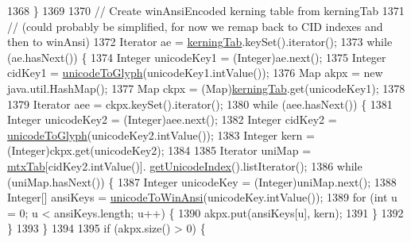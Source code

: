 \begin{DoxyCode}
1368             \}
1369 
1370             \textcolor{comment}{// Create winAnsiEncoded kerning table from kerningTab}
1371             \textcolor{comment}{// (could probably be simplified, for now we remap back to CID indexes and then to winAnsi)}
1372             Iterator ae = \mbox{\hyperlink{classorg_1_1newdawn_1_1slick_1_1tools_1_1hiero_1_1truetype_1_1_t_t_f_file_aff91f31cbfd733d87daa89435a5245fd}{kerningTab}}.keySet().iterator();
1373             \textcolor{keywordflow}{while} (ae.hasNext()) \{
1374                 Integer unicodeKey1 = (Integer)ae.next();
1375                 Integer cidKey1 = \mbox{\hyperlink{classorg_1_1newdawn_1_1slick_1_1tools_1_1hiero_1_1truetype_1_1_t_t_f_file_a32307b9061a332f3bf5bc5a8a3f1543f}{unicodeToGlyph}}(unicodeKey1.intValue());
1376                 Map akpx = \textcolor{keyword}{new} java.util.HashMap();
1377                 Map ckpx = (Map)\mbox{\hyperlink{classorg_1_1newdawn_1_1slick_1_1tools_1_1hiero_1_1truetype_1_1_t_t_f_file_aff91f31cbfd733d87daa89435a5245fd}{kerningTab}}.get(unicodeKey1);
1378 
1379                 Iterator aee = ckpx.keySet().iterator();
1380                 \textcolor{keywordflow}{while} (aee.hasNext()) \{
1381                     Integer unicodeKey2 = (Integer)aee.next();
1382                     Integer cidKey2 = \mbox{\hyperlink{classorg_1_1newdawn_1_1slick_1_1tools_1_1hiero_1_1truetype_1_1_t_t_f_file_a32307b9061a332f3bf5bc5a8a3f1543f}{unicodeToGlyph}}(unicodeKey2.intValue());
1383                     Integer kern = (Integer)ckpx.get(unicodeKey2);
1384 
1385                     Iterator uniMap = \mbox{\hyperlink{classorg_1_1newdawn_1_1slick_1_1tools_1_1hiero_1_1truetype_1_1_t_t_f_file_ad78a13682e242fc4a0b5d34a8e5807fa}{mtxTab}}[cidKey2.intValue()].
      \mbox{\hyperlink{classorg_1_1newdawn_1_1slick_1_1tools_1_1hiero_1_1truetype_1_1_t_t_f_mtx_entry_a79a6c962b51cadf170541ef839267b87}{getUnicodeIndex}}().listIterator();
1386                     \textcolor{keywordflow}{while} (uniMap.hasNext()) \{
1387                         Integer unicodeKey = (Integer)uniMap.next();
1388                         Integer[] ansiKeys = \mbox{\hyperlink{classorg_1_1newdawn_1_1slick_1_1tools_1_1hiero_1_1truetype_1_1_t_t_f_file_a20efa0bc697dd6dedcaa08b66eaa4660}{unicodeToWinAnsi}}(unicodeKey.intValue());
1389                         \textcolor{keywordflow}{for} (\textcolor{keywordtype}{int} u = 0; u < ansiKeys.length; u++) \{
1390                             akpx.put(ansiKeys[u], kern);
1391                         \}
1392                     \}
1393                 \}
1394 
1395                 \textcolor{keywordflow}{if} (akpx.size() > 0) \{

\end{DoxyCode}
